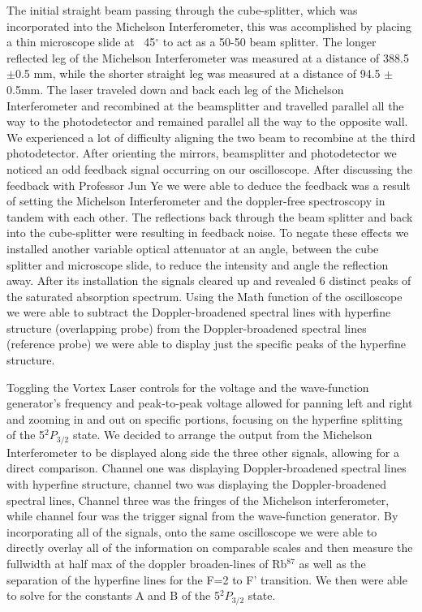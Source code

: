 \documentclass[12pt]{article}
\begin{document}
The initial straight beam passing through the cube-splitter, which was incorporated into the Michelson Interferometer, this was accomplished by placing a thin microscope slide at ~45$^{\circ}$ to act as a 50-50 beam splitter. The longer reflected leg of the Michelson Interferometer was measured at a distance of 388.5 $\pm $0.5 mm, while the shorter straight leg was measured at a distance of 94.5 $\pm $0.5mm. The laser traveled down and back each leg of the Michelson Interferometer and recombined at the beamsplitter and travelled parallel all the way to the photodetector and remained parallel all the way to the opposite wall. We experienced a lot of difficulty aligning the two beam to recombine at the third photodetector. After orienting the mirrors, beamsplitter and photodetector we noticed an odd feedback signal occurring on our oscilloscope. After discussing the feedback with Professor Jun Ye we were able to deduce the feedback was a result of setting the Michelson Interferometer and the doppler-free spectroscopy in tandem with each other. The reflections back through the beam splitter and back into the cube-splitter were resulting in feedback noise. To negate these effects we installed another variable optical attenuator at an angle, between the cube splitter and microscope slide, to reduce the intensity and angle the reflection away. After its installation the signals cleared up and revealed 6 distinct peaks of the saturated absorption spectrum. Using the Math function of the oscilloscope we were able to subtract the Doppler-broadened spectral lines with hyperfine structure (overlapping probe) from the Doppler-broadened spectral lines (reference probe) we were able to display just the specific peaks of the hyperfine structure. 

Toggling the Vortex Laser controls for the voltage and the wave-function generator’s frequency and peak-to-peak voltage allowed for panning left and right and zooming in and out on specific portions, focusing on the hyperfine splitting of the 5$^2P_{3/2} $ state.  We decided to arrange the output from the Michelson Interferometer to be displayed along side the three other signals, allowing for a direct comparison. Channel one was displaying Doppler-broadened spectral lines with hyperfine structure, channel two was displaying the Doppler-broadened spectral lines, Channel three was the fringes of the Michelson interferometer, while channel four was the trigger signal from the wave-function generator. By incorporating all of the signals, onto the same oscilloscope we were able to directly overlay all of the information on comparable scales and then measure the fullwidth at half max  of the doppler broaden-lines of Rb$^{87} $ as well as the separation of the hyperfine lines for the F=2 to F' transition. We then were able to solve for the constants A and B of the 5$^2 P_{3/2}$ state.
\end{document}
